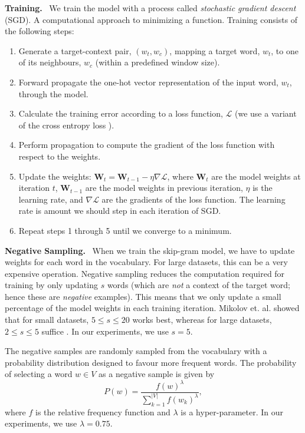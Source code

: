 \documentclass{paper}
\newcommand{\mat}[1]{\bm{#1}}
\newcommand{\inlineSection}[1]{\vspace{0.5em}\noindent\textbf{#1.}~}
\begin{document}
\inlineSection{Training} We train the model with a process called \textit{stochastic gradient descent} (SGD). A computational approach to minimizing a function. Training consists of the following steps:
\begin{enumerate}
    \item Generate a target-context pair, $(w_t, w_c)$, mapping a target word, $w_t$, to one of its neighbours, $w_c$ (within a predefined window size).
    \item Forward propagate the one-hot vector representation of the input word, $w_t$, through the model.
    \item Calculate the training error according to a loss function, $\mathcal{L}$ (we use a variant of the cross entropy loss \cite{mikolov2013efficient, goldberg2014word2vec}).
    \item Perform propagation to compute the gradient of the loss function with respect to the weights.
    \item Update the weights: $\mat{W}_t=\mat{W}_{t-1}-\eta\nabla\mathcal{L}$, where $\mat{W}_t$ are the model weights at iteration $t$, $\mat{W}_{t-1}$ are the model weights in previous iteration, $\eta$ is the learning rate, and $\nabla\mathcal{L}$ are the gradients of the loss function. The learning rate is amount we should step in each iteration of SGD.
    \item Repeat steps 1 through 5 until we converge to a minimum.
\end{enumerate}

\inlineSection{Negative Sampling} When we train the skip-gram model, we have to update weights for each word in the vocabulary. For large datasets, this can be a very expensive operation. Negative sampling reduces the computation required for training by only updating $s$ words (which are \textit{not} a context of the target word; hence these are \textit{negative} examples). This means that we only update a small percentage of the model weights in each training iteration. Mikolov et. al. showed that for small datasets, $5\leq s\leq 20$ works best, whereas for large datasets, $2\leq s\leq 5$ suffice \cite{mikolov2013efficient}. In our experiments, we use $s=5$.

The negative samples are randomly sampled from the vocabulary with a probability distribution designed to favour more frequent words. The probability of selecting a word $w\in V$ as a negative sample is given by
\begin{equation}
    \label{eq:word2vec_neg_sample_distribution}
    P(w)=\frac{f(w)^\lambda}{\sum_{k=1}^{|V|}f(w_k)^\lambda},
\end{equation}
where $f$ is the relative frequency function and $\lambda$ is a hyper-parameter. In our experiments, we use $\lambda = 0.75$.
\end{document}
